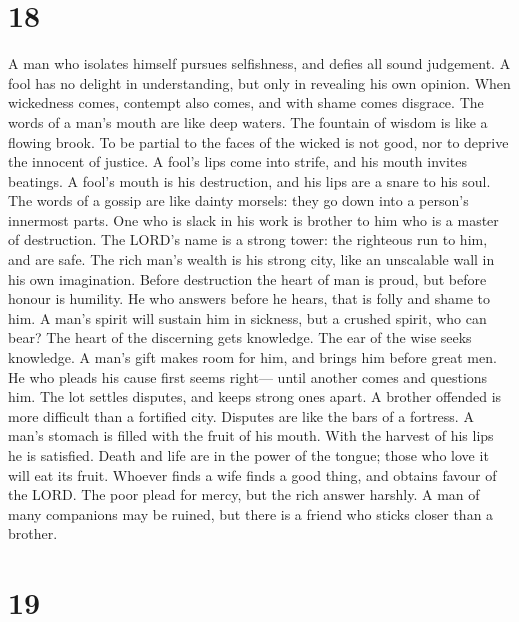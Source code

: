 \hypertarget{section-17}{%
\section{18}\label{section-17}}

 A man who isolates himself pursues selfishness, and defies
all sound judgement.  A fool has no delight in
understanding, but only in revealing his own opinion.  When
wickedness comes, contempt also comes, and with shame comes disgrace.
 The words of a man's mouth are like deep waters. The
fountain of wisdom is like a flowing brook.  To be partial
to the faces of the wicked is not good, nor to deprive the innocent of
justice.  A fool's lips come into strife, and his mouth
invites beatings.  A fool's mouth is his destruction, and
his lips are a snare to his soul.  The words of a gossip are
like dainty morsels: they go down into a person's innermost parts.
 One who is slack in his work is brother to him who is a
master of destruction.  The LORD's name is a strong tower:
the righteous run to him, and are safe.  The rich man's
wealth is his strong city, like an unscalable wall in his own
imagination.  Before destruction the heart of man is proud,
but before honour is humility.  He who answers before he
hears, that is folly and shame to him.  A man's spirit will
sustain him in sickness, but a crushed spirit, who can bear?
 The heart of the discerning gets knowledge. The ear of the
wise seeks knowledge.  A man's gift makes room for him, and
brings him before great men.  He who pleads his cause first
seems right--- until another comes and questions him.  The
lot settles disputes, and keeps strong ones apart.  A
brother offended is more difficult than a fortified city. Disputes are
like the bars of a fortress.  A man's stomach is filled
with the fruit of his mouth. With the harvest of his lips he is
satisfied.  Death and life are in the power of the tongue;
those who love it will eat its fruit.  Whoever finds a wife
finds a good thing, and obtains favour of the LORD.  The
poor plead for mercy, but the rich answer harshly.  A man
of many companions may be ruined, but there is a friend who sticks
closer than a brother.

\hypertarget{section-18}{%
\section{19}\label{section-18}}

